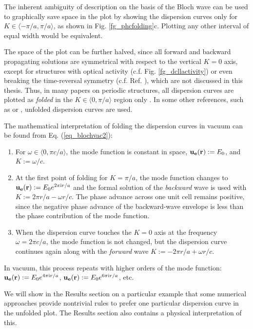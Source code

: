 \label{par_disp_curv_per}
The inherent ambiguity of description on the basis of the Bloch wave can be used to graphically save space in the plot by showing the dispersion curves only for $K\in\langle-\pi/a, \pi/a\rangle$, as shown in Fig. \ref{fg_phcfolding}c. Plotting any other interval of equal width would be equivalent. 

The space of the plot can be further halved, since all forward and backward propagating solutions are symmetrical with respect to the vertical $K=0$ axis, except for structures with optical activity (c.f. Fig. \ref{fg_dcllactivity}) or even breaking the time-reversal symmetry (c.f. Ref. \cite{vanwolleghem2009unidirectional}), which are not discussed in this thesis. Thus, in many papers on periodic structures, all dispersion curves are plotted as \textit{folded} in the $K\in\langle0, \pi/a\rangle$ region only \cite{obrien2002photonic,yannopapas2005negative}. In some other references, such as \cite{mortensen2010unambiguous} or \cite{yeh1977electromagnetic}, unfolded dispersion curves are used.

The mathematical interpretation of folding the dispersion curves in vacuum can be found from Eq. (\ref{eq_blochvac2}): 
\begin{enumerate}
\item{
For  $\omega\in\langle 0, \pi c /a\rangle$, the mode function is constant in space, $\mathbf{u_e}({\mathbf{r}}) := E_0$, and $K := \omega/c$. 
} 
\item{
At the first point of folding for $K=\pi/a$, the mode function changes to $\mathbf{u_e}({\mathbf{r}}) := E_0 e^{2\pi{\mathrm i} r/a}$ and the formal solution of the \textit{backward} wave is used with $K := 2\pi r/a - \omega r/c$.  The phase advance across one unit cell remains positive, since the negative phase advance of the backward-wave envelope is less than the phase contribution of the mode function.
} 
\item{
When the dispersion curve touches the $K=0$ axis at the frequency $\omega = 2\pi c/a$, the mode function is not changed, but the dispersion curve continues again along with the \textit{forward} wave $K := - 2\pi r/a + \omega r/c$. 
} 
 \end{enumerate}
In vacuum, this process repeats with higher orders of the mode function: $\mathbf{u_e}({\mathbf{r}}) := E_0 e^{4\pi{\mathrm i} r/a}$, $\mathbf{u_e}({\mathbf{r}}) := E_0 e^{6\pi{\mathrm i} r/a}$, etc.

We will show in the Results section on a particular example that some numerical approaches provide nontrivial rules to prefer one particular dispersion curve in the unfolded plot. The Results section also contains a physical interpretation of this.


